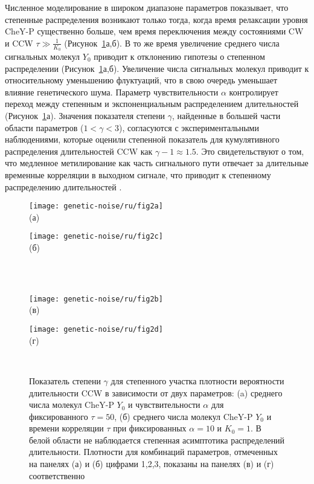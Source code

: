 Численное моделирование в широком диапазоне параметров показывает, что степенные распределения возникают только тогда, когда время релаксации уровня CheY-P существенно больше, чем время переключения между состояниями CW и CCW $\tau \gg \frac{1}{K_0}$ (Рисунок~\cref{fig:pdf-gamma-grid-1}а,б). В то же время увеличение среднего числа сигнальных молекул $Y_0$ приводит к отклонению гипотезы о степенном распределении (Рисунок~\cref{fig:pdf-gamma-grid-1}а,б). Увеличение числа сигнальных молекул приводит к относительному уменьшению флуктуаций, что в свою очередь уменьшает влияние генетического шума. Параметр чувствительности $\alpha$ контролирует переход между степенным и экспоненциальным распределением длительностей (Рисунок~\cref{fig:pdf-gamma-grid-1}а). Значения показателя степени $\gamma$, найденные в большей части области параметров ($1 < \gamma < 3$), согласуются с экспериментальными наблюдениями, которые оценили степенной показатель для кумулятивного распределения длительностей CCW как $\gamma - 1 \approx 1.5$. Это свидетельствуют о том, что медленное метилирование как часть сигнального пути отвечает за длительные временные корреляции в выходном сигнале, что приводит к степенному распределению длительностей \cite{korobkova_molecular_2004}. 


\begin{figure}[!ht]
    \begin{minipage}[b][][b]{0.45\linewidth}\centering
        \texttt{[image: genetic-noise/ru/fig2a]} \\ (а)
    \end{minipage}
    \hfill
    \begin{minipage}[b][][b]{0.45\linewidth}\centering
        \texttt{[image: genetic-noise/ru/fig2c]} \\ (б)
    \end{minipage}\\ \\
    \begin{minipage}[b][][b]{0.45\linewidth}\centering
        \texttt{[image: genetic-noise/ru/fig2b]} \\ (в)
    \end{minipage}
    \hfill
    \begin{minipage}[b][][b]{0.45\linewidth}\centering
        \texttt{[image: genetic-noise/ru/fig2d]} \\ (г)
    \end{minipage} \\
    \caption{
        Показатель степени $\gamma$ для степенного участка плотности вероятности длительности CCW в зависимости от двух параметров: (a) среднего числа молекул CheY-P $Y_0$ и чувствительности $\alpha$ для фиксированного $\tau = 50$, (б) среднего числа молекул CheY-P $Y_0$ и времени корреляции $\tau$ при фиксированных $\alpha = 10$ и $K_0 = 1$. В белой области не наблюдается степенная асимптотика распределений длительности. Плотности для комбинаций параметров, отмеченных на панелях (а) и (б) цифрами 1,2,3, показаны на панелях (в) и (г) соответственно
    }\label{fig:pdf-gamma-grid-1}
\end{figure}

